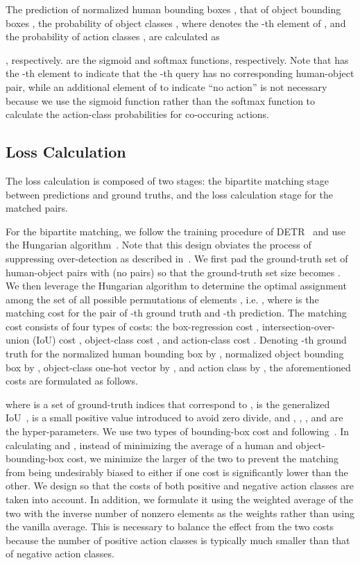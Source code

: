 \documentclass[final]{cvpr}
\begin{document}
The prediction of normalized human bounding boxes 
, 
 that of object bounding boxes , 
 the probability of object classes , where  denotes the -th element of ,
 and the probability of action classes , 
are calculated as 

, respectively.
 are the sigmoid and softmax functions, respectively. 
Note that  has the -th element to indicate that the -th query has no corresponding human-object pair, while an additional element of  to indicate ``no action'' is not necessary because we use the sigmoid function rather than the softmax function to calculate the action-class probabilities for co-occuring actions. 

\subsection{Loss Calculation}\label{subsec:int_train}
The loss calculation is composed of two stages: the bipartite matching stage between predictions and ground truths, and the loss calculation stage for the matched pairs.

For the bipartite matching, 
we follow the training procedure of DETR~\cite{carion_eccv2020} and use the Hungarian algorithm~\cite{kuhn_1955}. 
Note that this design obviates the process of suppressing over-detection as described in~\cite{carion_eccv2020}.
We first pad the ground-truth set of human-object pairs with  (no pairs) so that the ground-truth set size becomes .
We then leverage the Hungarian algorithm to determine the optimal assignment  among the set of all possible permutations of  elements ,
 i.e. , where  is the matching cost for the pair of -th ground truth and -th prediction.
The matching cost  consists of four types of costs: 
the box-regression cost , intersection-over-union (IoU) cost , object-class cost , and action-class cost .
Denoting -th ground truth for
 the normalized human bounding box by , 
 normalized object bounding box by , 
 object-class one-hot vector by ,
 and action class by ,
 the aforementioned costs are formulated as follows.

where  is a set of ground-truth indices that correspond to , 
 is the generalized IoU~\cite{rezatofighi_cvpr2019},
 is a small positive value introduced to avoid zero divide,
and , , , and  are the hyper-parameters.
We use two types of bounding-box cost  and  following~\cite{carion_eccv2020}.
In calculating  and , instead of minimizing the average of a human and object-bounding-box cost, we minimize the larger of the two to prevent the matching from being undesirably biased to either if one cost is significantly lower than the other. 
We design  so that the costs of both positive and negative action classes are taken into account. 
In addition, we formulate it using the weighted average of the two with the inverse number of nonzero elements as the weights rather than using the vanilla average.
This is necessary to balance the effect from the two costs because the number of positive action classes is typically much smaller than that of negative action classes.
\end{document}

